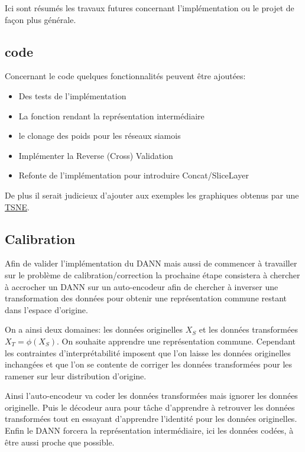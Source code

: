 
Ici sont résumés les travaux futures concernant l'implémentation 
ou le projet de façon plus générale.

\subsection{code} %
\label{sub:code}
Concernant le code quelques fonctionnalités peuvent être ajoutées:
\begin{itemize}
	\item Des tests de l'implémentation
	\item La fonction rendant la représentation intermédiaire
	\item le clonage des poids pour les réseaux siamois
	\item Implémenter la Reverse (Cross) Validation
	\item Refonte de l'implémentation pour introduire Concat/SliceLayer
\end{itemize}

De plus il serait judicieux d'ajouter aux exemples les graphiques obtenus
par une \href{http://scikit-learn.org/stable/modules/generated/sklearn.manifold.TSNE.html}{TSNE}.

\subsection{Calibration} %
\label{sub:calibration}

Afin de valider l'implémentation du DANN mais aussi de commencer à travailler
sur le problème de calibration/correction la prochaine étape consistera à 
chercher à accrocher un DANN sur un auto-encodeur afin de chercher à inverser
une transformation des données pour obtenir une représentation commune restant
dans l'espace d'origine.

On a ainsi deux domaines: 
les données originelles $X_S$ et les données transformées $X_T = \phi(X_S)$.
On souhaite apprendre une représentation commune. Cependant les contraintes 
d'interprétabilité imposent que l'on laisse les données originelles inchangées et 
que l'on se contente de corriger les données transformées pour les ramener sur
leur distribution d'origine.

Ainsi l'auto-encodeur va coder les données transformées mais ignorer les données
originelle. Puis le décodeur aura pour tâche d'apprendre à retrouver les données
transformées tout en essayant d'apprendre l'identité pour les données originelles.
Enfin le DANN forcera la représentation intermédiaire, ici les données codées, à
être aussi proche que possible.

